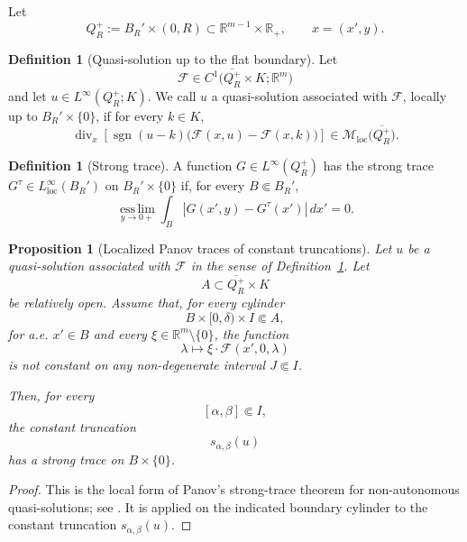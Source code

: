 \documentclass[11pt]{amsart}
\numberwithin{equation}{section}
\theoremstyle{plain}
\newtheorem{proposition}[theorem]{Proposition}
\theoremstyle{definition}
\newtheorem{definition}[theorem]{Definition}
\theoremstyle{remark}
\begin{document}
Let
\[
    Q_R^+:=B_R'\times(0,R)
    \subset\mathbb R^{m-1}\times\mathbb R_+,
    \qquad
    x=(x',y).
\]

\begin{definition}[Quasi-solution up to the flat boundary]
\label{def:quasi-solution-replaced-vector}
Let
\[
    \mathcal F\in
    C^1\bigl(\overline{Q_R^+}\times K;\mathbb R^m\bigr)
\]
and let \(u\in L^\infty(Q_R^+;K)\).  We call \(u\) a quasi-solution
associated with \(\mathcal F\), locally up to \(B_R'\times\{0\}\), if for
every \(k\in K\),
\begin{equation}
\label{eq:quasi-entropy-production}
    \operatorname{div}_x
    \left[
        \operatorname{sgn}(u-k)
        \bigl(
            \mathcal F(x,u)-\mathcal F(x,k)
        \bigr)
    \right]
    \in
    \mathcal M_{\mathrm{loc}}
    \bigl(\overline{Q_R^+}\bigr).
\end{equation}
\end{definition}

\begin{definition}[Strong trace]
\label{def:strong-trace}
A function \(G\in L^\infty(Q_R^+)\) has the strong trace
\(G^\tau\in L^\infty_{\mathrm{loc}}(B_R')\) on
\(B_R'\times\{0\}\) if, for every \(B\Subset B_R'\),
\begin{equation}
\label{eq:strong-trace-definition}
    \operatorname*{ess\,lim}_{y\to0+}
    \int_B
        |G(x',y)-G^\tau(x')|\,dx'
    =0.
\end{equation}
\end{definition}

\begin{proposition}[Localized Panov traces of constant truncations]
\label{prop:localized-panov-traces}
Let \(u\) be a quasi-solution associated with \(\mathcal F\) in the sense of
Definition~\ref{def:quasi-solution-replaced-vector}.  Let
\[
    A\subset\overline{Q_R^+}\times K
\]
be relatively open.  Assume that, for every cylinder
\[
    B\times[0,\delta)\times I\Subset A,
\]
for a.e. \(x'\in B\) and every
\(\xi\in\mathbb R^m\setminus\{0\}\), the function
\[
    \lambda\longmapsto
    \xi\cdot\mathcal F(x',0,\lambda)
\]
is not constant on any non-degenerate interval \(J\Subset I\).

Then, for every
\[
    [\alpha,\beta]\Subset I,
\]
the constant truncation
\[
    s_{\alpha,\beta}(u)
\]
has a strong trace on \(B\times\{0\}\).
\end{proposition}

\begin{proof}
This is the local form of Panov's strong-trace theorem for non-autonomous
quasi-solutions; see \cite[Remark~6.2]{PanovTraces2007}.  It is applied on the
indicated boundary cylinder to the constant truncation
\(s_{\alpha,\beta}(u)\).
\end{proof}
\end{document}
